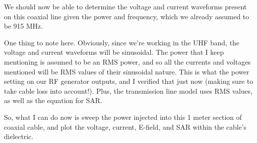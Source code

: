 \documentclass[12pt,onecolumn,titlepage]{article}
\begin{document}
We should now be able to determine the voltage and current waveforms present on this coaxial line given the power and frequency, which we already assumed to be 915 MHz. 

One thing to note here. Obviously, since we're working in the UHF band, the voltage and current waveforms will be sinusoidal. The power that I keep mentioning is assumed to be an RMS power, and so all the currents and voltages mentioned will be RMS values of their sinusoidal nature. This is what the power setting on our RF generator outputs, and I verified that just now (making sure to take cable loss into account!). Plus, the transmission line model uses RMS values, as well as the equation for SAR.

So, what I can do now is sweep the power injected into this 1 meter section of coaxial cable, and plot the voltage, current, E-field, and SAR within the cable's dielectric. 
\end{document}
